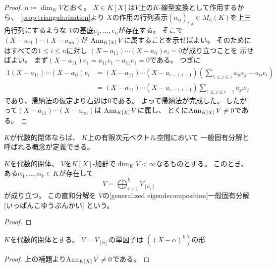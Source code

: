 \documentclass[report]{jlreq}
\begin{document}
\begin{proof}
    $n \coloneqq \dim_K V$とおく。
    $X \in K[X]$は$V$上の$K$-線型変換として作用するから、
    \cref{prop:triangularization}より
    $X$の作用の行列表示$(a_{ij})_{i, j} \in M_{n}(K)$を上三角行列にするような
    $V$の基底$e_1, \dots, e_n$が存在する。
    そこで$(X - a_{11}) \cdots (X - a_{nn})$が
    $\operatorname{Ann}_{K[X]} V$に属することを示せばよい。
    そのためにはすべての$1 \le i \le n$に対し
    $(X - a_{11}) \cdots (X - a_{ii}) e_i = 0$が成り立つことを
    示せばよい。
    まず$(X - a_{11}) e_1 = a_{11} e_1 - a_{11} e_1 = 0$である。
    つぎに
    \begin{alignat}{1}
        (X - a_{11}) \cdots (X - a_{ii}) e_i
            &= (X - a_{11}) \cdots (X - a_{i - 1, i - 1})
                \left( \sum_{1 \le j \le i} a_{ji} e_j - a_{ii} e_i \right) \\
            &= (X - a_{11}) \cdots (X - a_{i - 1, i - 1})
                \sum_{1 \le j \le i - 1} a_{ji} e_j
    \end{alignat}
    であり、帰納法の仮定より右辺は$0$である。
    よって帰納法が完成した。
    したがって$(X - a_{11}) \cdots (X - a_{nn})$は
    $\operatorname{Ann}_{K[X]} V$に属し、
    とくに$\operatorname{Ann}_{K[X]} V \neq 0$である。
\end{proof}

$K$が代数的閉体ならば、
$K$上の有限次元ベクトル空間において
一般固有分解と呼ばれる概念が定義できる。

\begin{theorem}[一般固有分解]
    $K$を代数的閉体、
    $V$を$K[X]$-加群で$\dim_K V < \infty$なるものとする。
    このとき、ある$\alpha_1, \dots, \alpha_k \in K$が存在して
    \begin{equation}
        V = \bigoplus_{i = 1}^k V_{[\alpha_i]}
    \end{equation}
    が成り立つ。
    この直和分解を
    $V$の[generalized eigendecomposition]{一般固有分解}[いっぱんこゆうぶんかい]
    という。
\end{theorem}

\begin{proof}
    \TODO{}
\end{proof}

\begin{lemma}
    $K$を代数的閉体とする。
    $V = V_{[\alpha]}$の単因子は
    $((X - \alpha)^k)$の形
    \TODO{}
\end{lemma}

\begin{proof}
    上の補題より$\operatorname{Ann}_{K[X]} V \neq 0$である。
    \TODO{}
\end{proof}
\end{document}
